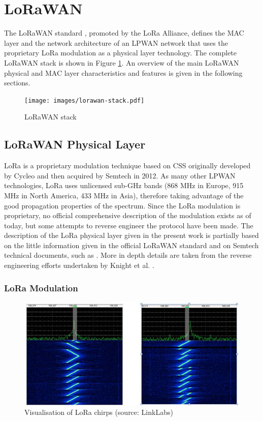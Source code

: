 \section{LoRaWAN} \label{sec:lorawan}

The LoRaWAN standard \cite{ref:bg-lorawan-spec}, promoted by the LoRa Alliance, defines the MAC layer and the network architecture of an \gls{LPWAN} network that uses the proprietary LoRa modulation as a physical layer technology. The complete LoRaWAN stack is shown in Figure \ref{fig:lorawan-stack}. An overview of the main LoRaWAN physical and MAC layer characteristics and features is given in the following sections.

\begin{figure}[h]
    \centering
    \texttt{[image: images/lorawan-stack.pdf]}
    \caption{LoRaWAN stack}
    \label{fig:lorawan-stack}
\end{figure}

\subsection{LoRaWAN Physical Layer}

LoRa is a proprietary modulation technique based on \gls{CSS} originally developed by Cycleo and then acquired by Semtech in 2012. As many other \gls{LPWAN} technologies, LoRa uses unlicensed sub-GHz bands (868 MHz in Europe, 915 MHz in North America, 433 MHz in Asia), therefore taking advantage of the good propagation properties of the spectrum. Since the LoRa modulation is proprietary, no official comprehensive description of the modulation exists as of today, but some attempts to reverse engineer the protocol have been made. The description of the LoRa physical layer given in the present work is partially based on the little information given in the official LoRaWAN standard \cite{ref:bg-lorawan-spec} and on Semtech technical documents, such as \cite{ref:bg-semtech-lora}. More in depth details are taken from the reverse engineering efforts undertaken by Knight et al. \cite{ref:bg-reversing-lora1} \cite{ref:bg-reversing-lora2}.

\subsubsection{LoRa Modulation}

\begin{figure}[h]
    \centering
    \includegraphics[width=1\textwidth]{images/lora-chirps.jpg}
    \caption{Visualisation of LoRa chirps (source: LinkLabs)}
    \label{fig:lora-chirps}
\end{figure}

